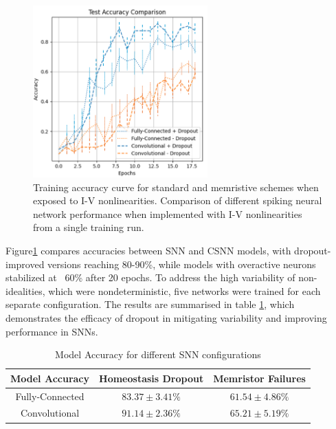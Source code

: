 \begin{figure}[!t]
    \centerline{\includegraphics[width=0.6\textwidth]{Chapter7/Figs/d.png}}
    \caption[Training accuracy curve for standard and memristive schemes when exposed to I-V nonlinearities]{Training accuracy curve for standard and memristive schemes when exposed to I-V nonlinearities. Comparison of different spiking neural network performance when implemented with I-V nonlinearities from a single training run.}
    \label{fig:7d}
\end{figure}
    
\noindent Figure\ref{fig:7d} compares accuracies between SNN and CSNN models, with dropout-improved versions reaching 80-90\%, while models with overactive neurons stabilized at ~60\% after 20 epochs. To address the high variability of non-idealities, which were nondeterministic, five networks were trained for each separate configuration. The results are summarised in table \ref{table:7a}, which demonstrates the efficacy of dropout in mitigating variability and improving performance in SNNs. \\

\begin{table}[!t]
    \caption{Model Accuracy for different SNN configurations}
    \begin{center}
    \begin{tabular}{|c|c|c|}
    \hline
    Model Accuracy  & Homeostasis Dropout & Memristor Failures \\ \hline
    Fully-Connected & $83.37 \pm 3.41 \%$  & $61.54 \pm 4.86 \%$ \\ \hline
    Convolutional   & $91.14 \pm 2.36 \%$  & $65.21 \pm 5.19 \%$  \\ \hline
    \end{tabular}
    \label{table:7a}
    \end{center}
    \vspace*{-\baselineskip}
\end{table}


